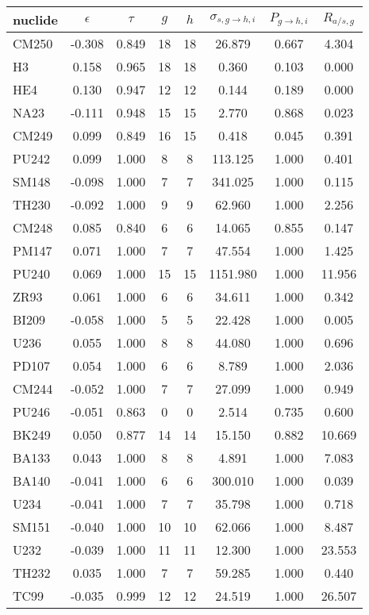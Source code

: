 \begin{tabular}{|l|ccccccc|}
\hline
nuclide & $\epsilon$ & $\tau$ & $g$ & $h$ & $\sigma_{s,g\to h,i}$ & $P_{g\to h,i}$ & $R_{a/s,g}$\\
\hline
CM250 & -0.308 & 0.849 & 18 & 18 & 26.879 & 0.667 & 4.304\\
H3 & 0.158 & 0.965 & 18 & 18 & 0.360 & 0.103 & 0.000\\
HE4 & 0.130 & 0.947 & 12 & 12 & 0.144 & 0.189 & 0.000\\
NA23 & -0.111 & 0.948 & 15 & 15 & 2.770 & 0.868 & 0.023\\
CM249 & 0.099 & 0.849 & 16 & 15 & 0.418 & 0.045 & 0.391\\
PU242 & 0.099 & 1.000 & 8 & 8 & 113.125 & 1.000 & 0.401\\
SM148 & -0.098 & 1.000 & 7 & 7 & 341.025 & 1.000 & 0.115\\
TH230 & -0.092 & 1.000 & 9 & 9 & 62.960 & 1.000 & 2.256\\
CM248 & 0.085 & 0.840 & 6 & 6 & 14.065 & 0.855 & 0.147\\
PM147 & 0.071 & 1.000 & 7 & 7 & 47.554 & 1.000 & 1.425\\
PU240 & 0.069 & 1.000 & 15 & 15 & 1151.980 & 1.000 & 11.956\\
ZR93 & 0.061 & 1.000 & 6 & 6 & 34.611 & 1.000 & 0.342\\
BI209 & -0.058 & 1.000 & 5 & 5 & 22.428 & 1.000 & 0.005\\
U236 & 0.055 & 1.000 & 8 & 8 & 44.080 & 1.000 & 0.696\\
PD107 & 0.054 & 1.000 & 6 & 6 & 8.789 & 1.000 & 2.036\\
CM244 & -0.052 & 1.000 & 7 & 7 & 27.099 & 1.000 & 0.949\\
PU246 & -0.051 & 0.863 & 0 & 0 & 2.514 & 0.735 & 0.600\\
BK249 & 0.050 & 0.877 & 14 & 14 & 15.150 & 0.882 & 10.669\\
BA133 & 0.043 & 1.000 & 8 & 8 & 4.891 & 1.000 & 7.083\\
BA140 & -0.041 & 1.000 & 6 & 6 & 300.010 & 1.000 & 0.039\\
U234 & -0.041 & 1.000 & 7 & 7 & 35.798 & 1.000 & 0.718\\
SM151 & -0.040 & 1.000 & 10 & 10 & 62.066 & 1.000 & 8.487\\
U232 & -0.039 & 1.000 & 11 & 11 & 12.300 & 1.000 & 23.553\\
TH232 & 0.035 & 1.000 & 7 & 7 & 59.285 & 1.000 & 0.440\\
TC99 & -0.035 & 0.999 & 12 & 12 & 24.519 & 1.000 & 26.507\\

\end{tabular}
